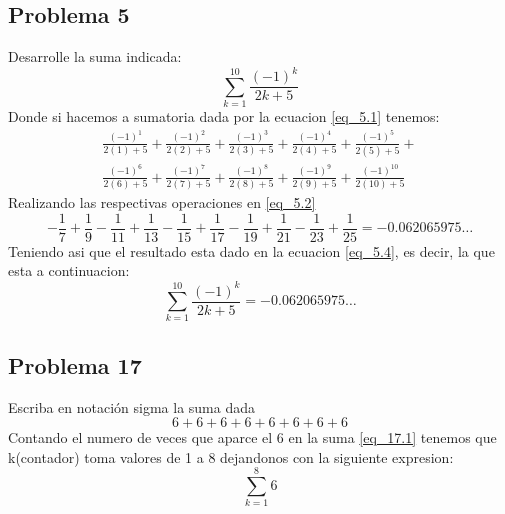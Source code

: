 \documentclass{article}
\begin{document}
\subsection{Problema 5}
Desarrolle la suma indicada:
\begin{equation}\label{eq_5.1}
  \sum_{k=1}^{10}\frac{(-1)^k}{2k+5}
\end{equation}
Donde si hacemos a sumatoria dada por la ecuacion \ref{eq_5.1} tenemos:
\begin{equation}\label{eq_5.2}
  \begin{split}
    \frac{(-1)^1}{2(1)+5}+\frac{(-1)^2}{2(2)+5}+\frac{(-1)^3}{2(3)+5}+\frac{(-1)^4}{2(4)+5}+\frac{(-1)^5}{2(5)+5}+\\\frac{(-1)^6}{2(6)+5}+\frac{(-1)^7}{2(7)+5}+\frac{(-1)^8}{2(8)+5}+\frac{(-1)^9}{2(9)+5}+\frac{(-1)^{10}}{2(10)+5}
  \end{split}
\end{equation}
Realizando las respectivas operaciones en \ref{eq_5.2}
\begin{equation}\label{eq_5.3}
  -\frac{1}{7}+\frac{1}{9}-\frac{1}{11}+\frac{1}{13}-\frac{1}{15}+\frac{1}{17}-\frac{1}{19}+\frac{1}{21}-\frac{1}{23}+\frac{1}{25} = -0.062065975\dots
\end{equation}
Teniendo asi que el resultado esta dado en la ecuacion \ref{eq_5.4}, es decir, la que esta a continuacion:
\begin{equation}\label{eq_5.4}
  \sum_{k=1}^{10}\frac{(-1)^k}{2k+5} = -0.062065975\dots
\end{equation}
\subsection{Problema 17}
Escriba en notación sigma la suma dada
\setcounter{equation}{0}
\begin{equation}\label{eq_17.1}
  6+6+6+6+6+6+6+6
\end{equation}
Contando el numero de veces que aparce el 6 en la suma \ref{eq_17.1} tenemos que k(contador) toma valores de 1 a 8 dejandonos con la siguiente expresion:
\begin{equation}\label{eq_17.2}
  \sum_{k=1}^{8}6
\end{equation}
\setcounter{equation}{0}
\end{document}
